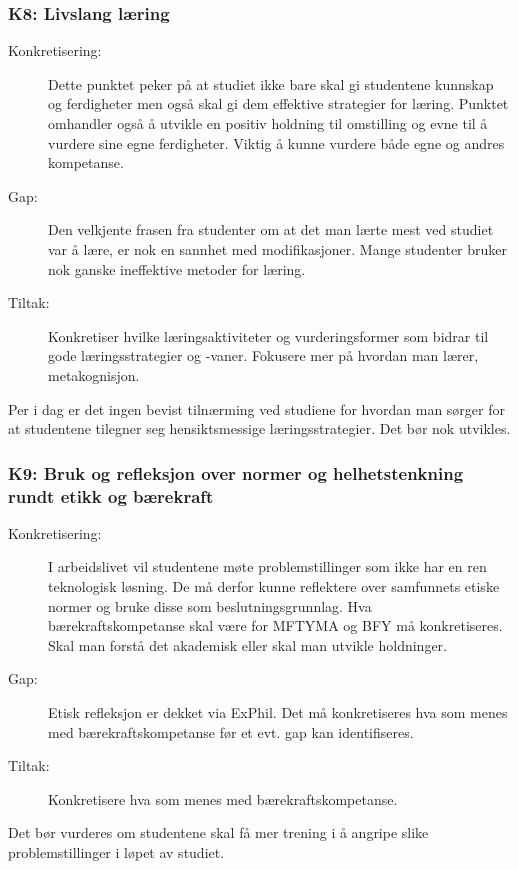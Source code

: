 \subsubsection{K8: Livslang læring}
\begin{description}
\item[Konkretisering:] Dette punktet peker på at studiet ikke bare skal gi studentene kunnskap og ferdigheter men også skal gi dem effektive strategier for læring. Punktet omhandler også å utvikle en positiv holdning til omstilling og evne til å vurdere sine egne ferdigheter. Viktig å kunne vurdere både egne og andres kompetanse.  
\item[Gap:] Den velkjente frasen fra studenter om at det man lærte mest ved studiet var å lære, er nok en sannhet med modifikasjoner. Mange studenter bruker nok ganske ineffektive metoder for læring. 
\item[Tiltak:] Konkretiser hvilke læringsaktiviteter og vurderingsformer som bidrar til gode læringsstrategier og -vaner. Fokusere mer på hvordan man lærer, metakognisjon.
\end{description}  

Per i dag er det ingen bevist tilnærming ved studiene for hvordan man sørger for at studentene tilegner seg hensiktsmessige læringsstrategier. Det bør nok utvikles.

\subsubsection{K9: Bruk og refleksjon over normer og helhetstenkning rundt etikk og bærekraft} 
\begin{description}
\item[Konkretisering:] I arbeidslivet vil studentene møte problemstillinger som ikke har en ren teknologisk løsning. De må derfor kunne reflektere over samfunnets etiske normer og bruke disse som beslutningsgrunnlag. Hva bærekraftskompetanse skal være for MFTYMA og BFY må konkretiseres. Skal man forstå det akademisk eller skal man utvikle holdninger.
\item[Gap:] Etisk refleksjon er dekket via ExPhil. Det må konkretiseres hva som menes med bærekraftskompetanse før et evt. gap kan identifiseres.
\item[Tiltak:] Konkretisere hva som menes med bærekraftskompetanse.
\end{description}

 Det bør vurderes om studentene skal få mer trening i å angripe slike problemstillinger i løpet av studiet.

